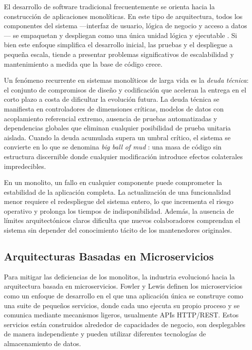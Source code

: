 El desarrollo de software tradicional frecuentemente se orienta hacia la construcci\'{o}n de aplicaciones monol\'{i}ticas. En este tipo de arquitectura, todos los componentes del sistema ---interfaz de usuario, l\'{o}gica de negocio y acceso a datos--- se empaquetan y despliegan como una \'{u}nica unidad l\'{o}gica y ejecutable \cite{richardson2018microservices}. Si bien este enfoque simplifica el desarrollo inicial, las pruebas y el despliegue a peque\~{n}a escala, tiende a presentar problemas significativos de escalabilidad y mantenimiento a medida que la base de c\'{o}digo crece.

Un fen\'{o}meno recurrente en sistemas monol\'{i}ticos de larga vida es la \textit{deuda t\'{e}cnica}: el conjunto de compromisos de dise\~{n}o y codificaci\'{o}n que aceleran la entrega en el corto plazo a costa de dificultar la evoluci\'{o}n futura. La deuda t\'{e}cnica se manifiesta en controladores de dimensiones cr\'{i}ticas, modelos de datos con acoplamiento referencial extremo, ausencia de pruebas automatizadas y dependencias globales que eliminan cualquier posibilidad de prueba unitaria aislada. Cuando la deuda acumulada supera un umbral cr\'{i}tico, el sistema se convierte en lo que se denomina \textit{big ball of mud} \cite{foote1997bigballofmud}: una masa de c\'{o}digo sin estructura discernible donde cualquier modificaci\'{o}n introduce efectos colaterales impredecibles.

En un monolito, un fallo en cualquier componente puede comprometer la estabilidad de la aplicaci\'{o}n completa. La actualizaci\'{o}n de una funcionalidad menor requiere el redespliegue del sistema entero, lo que incrementa el riesgo operativo y prolonga los tiempos de indisponibilidad. Adem\'{a}s, la ausencia de l\'{i}mites arquitect\'{o}nicos claros dificulta que nuevos colaboradores comprendan el sistema sin depender del conocimiento t\'{a}cito de los mantenedores originales.

\subsection{Arquitecturas Basadas en Microservicios}

Para mitigar las deficiencias de los monolitos, la industria evolucion\'{o} hacia la arquitectura basada en microservicios. Fowler y Lewis \cite{fowler2014microservices} definen los microservicios como un enfoque de desarrollo en el que una aplicaci\'{o}n \'{u}nica se construye como una suite de peque\~{n}os servicios, donde cada uno ejecuta su propio proceso y se comunica mediante mecanismos ligeros, usualmente APIs HTTP/REST. Estos servicios est\'{a}n construidos alrededor de capacidades de negocio, son desplegables de manera independiente y pueden utilizar diferentes tecnolog\'{i}as de almacenamiento de datos.

